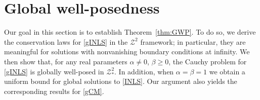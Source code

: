 \documentclass{amsart}
\numberwithin{equation}{section}
\begin{document}

\section{Global well-posedness}
\label{sec4}

Our goal in this section is to establish Theorem~\ref{thm:GWP}. To do so, we derive the conservation laws for \eqref{gINLS} in the $\mathcal{Z}^2$ framework; in particular, they are meaningful for solutions with nonvanishing boundary conditions at infinity. 
We then show that, for any real parameters $\alpha \neq 0$, $\beta \geq 0$, the Cauchy problem for \eqref{gINLS} is globally well-posed in $\mathcal{Z}^2_*$. 
In addition, when $\alpha =\beta =1$ we obtain a uniform bound for global solutions to \eqref{INLS}.
Our argument also yields the corresponding results for \eqref{gCM}.
\end{document}
